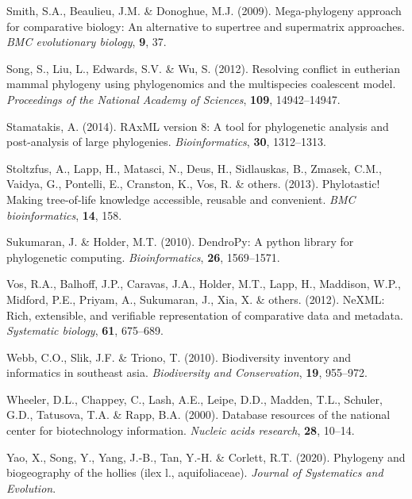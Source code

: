 \documentclass[]{article}
\begin{document}
\leavevmode\hypertarget{ref-smith2009mega}{}%
Smith, S.A., Beaulieu, J.M. \& Donoghue, M.J. (2009). Mega-phylogeny approach for comparative biology: An alternative to supertree and supermatrix approaches. \emph{BMC evolutionary biology}, \textbf{9}, 37.

\leavevmode\hypertarget{ref-song2012resolving}{}%
Song, S., Liu, L., Edwards, S.V. \& Wu, S. (2012). Resolving conflict in eutherian mammal phylogeny using phylogenomics and the multispecies coalescent model. \emph{Proceedings of the National Academy of Sciences}, \textbf{109}, 14942--14947.

\leavevmode\hypertarget{ref-stamatakis2014raxml}{}%
Stamatakis, A. (2014). RAxML version 8: A tool for phylogenetic analysis and post-analysis of large phylogenies. \emph{Bioinformatics}, \textbf{30}, 1312--1313.

\leavevmode\hypertarget{ref-stoltzfus2013phylotastic}{}%
Stoltzfus, A., Lapp, H., Matasci, N., Deus, H., Sidlauskas, B., Zmasek, C.M., Vaidya, G., Pontelli, E., Cranston, K., Vos, R. \& others. (2013). Phylotastic! Making tree-of-life knowledge accessible, reusable and convenient. \emph{BMC bioinformatics}, \textbf{14}, 158.

\leavevmode\hypertarget{ref-sukumaran2010dendropy}{}%
Sukumaran, J. \& Holder, M.T. (2010). DendroPy: A python library for phylogenetic computing. \emph{Bioinformatics}, \textbf{26}, 1569--1571.

\leavevmode\hypertarget{ref-vos2012nexml}{}%
Vos, R.A., Balhoff, J.P., Caravas, J.A., Holder, M.T., Lapp, H., Maddison, W.P., Midford, P.E., Priyam, A., Sukumaran, J., Xia, X. \& others. (2012). NeXML: Rich, extensible, and verifiable representation of comparative data and metadata. \emph{Systematic biology}, \textbf{61}, 675--689.

\leavevmode\hypertarget{ref-webb2010biodiversity}{}%
Webb, C.O., Slik, J.F. \& Triono, T. (2010). Biodiversity inventory and informatics in southeast asia. \emph{Biodiversity and Conservation}, \textbf{19}, 955--972.

\leavevmode\hypertarget{ref-wheeler2000database}{}%
Wheeler, D.L., Chappey, C., Lash, A.E., Leipe, D.D., Madden, T.L., Schuler, G.D., Tatusova, T.A. \& Rapp, B.A. (2000). Database resources of the national center for biotechnology information. \emph{Nucleic acids research}, \textbf{28}, 10--14.

\leavevmode\hypertarget{ref-yao2020phylogeny}{}%
Yao, X., Song, Y., Yang, J.-B., Tan, Y.-H. \& Corlett, R.T. (2020). Phylogeny and biogeography of the hollies (ilex l., aquifoliaceae). \emph{Journal of Systematics and Evolution}.
\end{document}
